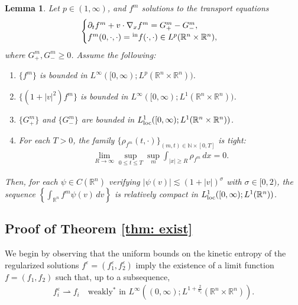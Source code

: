 \documentclass[10pt,reqno]{amsart}
\numberwithin{equation}{section}
\newtheorem{lemma}{Lemma}[section]
\newcommand{\R}{\mathbb R}
\newcommand{\N}{\mathbb N}
\newcommand{\p}{\partial}
\newcommand{\ve}{\varepsilon}
\begin{document}
\begin{lemma} \label{lem: avg}
    \cite[Proposition 4.1]{KS24} Let $p\in (1,\infty)$, and $f^m$ solutions to the transport equations
    \begin{align*}
        \begin{cases}
        \p_t f^m + v \cdot \nabla_x f^m = G^m_+ - G^m_-, \\f^m(0,\cdot,\cdot) = {}^{\rm in}f(\cdot,\cdot) \in L^p(\R^n \times \R^n),
        \end{cases}
    \end{align*}
    where $G^m_+, G^m_- \ge 0$. Assume the following:
    \begin{enumerate}[label=(\roman*)]
    \item $\{f^m\}$ is bounded in $L^\infty([0,\infty);L^p(\R^n \times \R^n))$.
    \item $\{(1+|v|^2)f^m\}$ is bounded in $L^\infty([0,\infty);L^1(\R^n \times \R^n))$.
    \item $\{G^m_+\}$ and $\{G^m_-\}$ are bounded in $L_{\rm loc}^1([0,\infty);L^1(\R^n \times \R^n))$.
    \item For each $T>0$, the family $\{\rho_{f^m}(t,\cdot)\}_{(m,t)\in\N\times[0,T]}$ is tight:
    \begin{align*}
    \lim_{R\to \infty} \sup_{0\le t \le T} \sup_{m} \int_{|x|\ge R} \rho_{f^m} \,dx = 0.
    \end{align*}
    \end{enumerate}
    Then, for each $\psi \in C(\R^n)$ verifying $|\psi(v)| \lesssim (1+|v|)^\sigma$ with $\sigma\in [0,2)$, the sequence $\left\{\int_{\R^n}f^{m}\psi(v)\, dv\right\}$ is relatively compact in $L_{\rm loc}^1([0,\infty);L^1(\R^n))$.
\end{lemma}


%
%
%
%
%
%
%
%
%
%
%
%
%
\subsection{Proof of Theorem \ref{thm: exist}}
We begin by observing that the uniform bounds on the kinetic entropy of the regularized solutions $f^\ve = (f_1^\ve, f_2^\ve)$ imply the existence of a limit function $f = (f_1, f_2)$ such that, up to a subsequence,
\begin{align*}
    f_i^\ve \rightharpoonup f_i \quad \text{weakly$^*$ in }L^\infty((0,\infty);L^{1+\frac{2}{d_i}}(\R^n \times \R^n)).
\end{align*}
\end{document}
